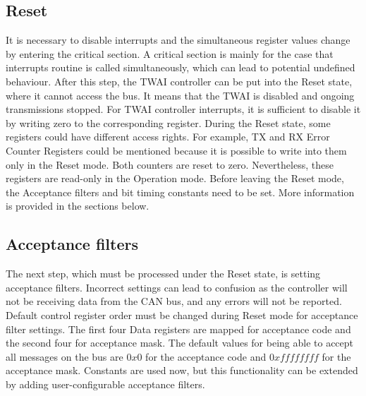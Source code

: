 \documentclass{ctuthesis}
\begin{document}
 \subsection{Reset}
 It is necessary to disable interrupts and the simultaneous register values change by entering the critical section. A critical section is mainly for the case that interrupts routine is called simultaneously, which can lead to potential undefined behaviour.  After this step, the TWAI controller can be put into the Reset state, where it cannot access the bus. It means that the TWAI is disabled and ongoing transmissions stopped. For TWAI controller interrupts, it is sufficient to disable it by writing zero to the corresponding register. During the Reset state, some registers could have different access rights. For example, TX and RX Error Counter Registers could be mentioned because it is possible to write into them only in the Reset mode. Both counters are reset to zero. Nevertheless, these registers are read-only in the Operation mode. Before leaving the Reset mode, the Acceptance filters and bit timing constants need to be set. More information is provided in the sections below.
 
 \subsection{Acceptance filters}
 The next step, which must be processed under the Reset state, is setting acceptance filters. Incorrect settings can lead to confusion as the controller will not be receiving data from the CAN bus, and any errors will not be reported. Default control register order must be changed during Reset mode for acceptance filter settings. The first four Data registers are mapped for acceptance code and the second four for acceptance mask. The default values for being able to accept all messages on the bus are $0x0$ for the acceptance code and $0xffffffff$ for the acceptance mask. Constants are used now, but this functionality can be extended by adding user-configurable acceptance filters.
 
\end{document}
